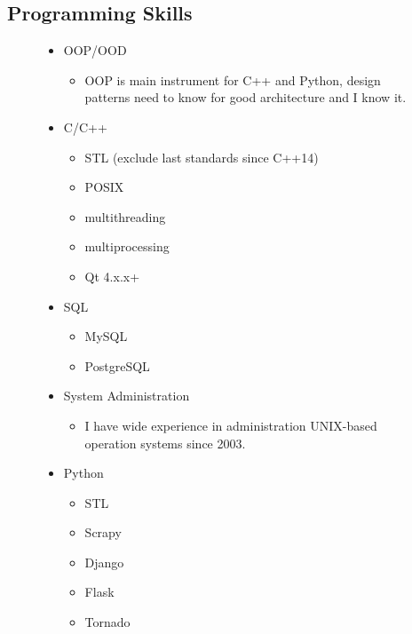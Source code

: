 \documentclass[letterpaper,11pt]{article}
\begin{document}
\subsection{Programming Skills}
\begin{figure}[h!]
  \begin{minipage}[h!]{0.49\textwidth}
    \begin{itemize}
      \item {OOP/OOD}
        \begin{itemize}
          \item OOP is main instrument for C++ and Python, design patterns need to know for good architecture and I know it.
        \end{itemize}
      \item{C/C++}
        \begin{itemize}
          \item STL (exclude last standards since C++14)
          \item POSIX
          \item multithreading
          \item multiprocessing
          \item Qt 4.x.x+
        \end{itemize}
      \item{SQL}
        \begin{itemize}
          \item MySQL
          \item PostgreSQL
        \end{itemize}
      \item{System Administration}
        \begin{itemize}
          \item I have wide experience in administration UNIX-based operation systems since 2003.
        \end{itemize}
      \vfill
    \end{itemize}
  \end{minipage}
  \hfill
  \begin{minipage}[h!]{0.49\textwidth}
    \begin{itemize}
      \item{Python}
        \begin{itemize}
          \item STL
          \item Scrapy
          \item Django
          \item Flask
          \item Tornado

\end{itemize}
\end{itemize}
\end{minipage}
\end{figure}
\end{document}
